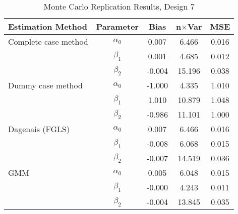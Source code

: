 \begin{table}
\centering
\caption{Monte Carlo Replication Results, Design 7}
\label{table:MCReplicationResultsDesign7}
\begin{tabular}{lcccc}
\toprule
Estimation Method & Parameter & Bias & n$\times$Var & MSE \\
\midrule
Complete case method & $\alpha_0$ & 0.007 & 6.466 & 0.016 \\
 & $\beta_1$ & 0.001 & 4.685 & 0.012 \\
 & $\beta_2$ & -0.004 & 15.196 & 0.038 \\
Dummy case method & $\alpha_0$ & -1.000 & 4.335 & 1.010 \\
 & $\beta_1$ & 1.010 & 10.879 & 1.048 \\
 & $\beta_2$ & -0.986 & 11.101 & 1.000 \\
Dagenais (FGLS) & $\alpha_0$ & 0.007 & 6.466 & 0.016 \\
 & $\beta_1$ & -0.008 & 6.068 & 0.015 \\
 & $\beta_2$ & -0.007 & 14.519 & 0.036 \\
GMM & $\alpha_0$ & 0.005 & 6.048 & 0.015 \\
 & $\beta_1$ & -0.000 & 4.243 & 0.011 \\
 & $\beta_2$ & -0.004 & 13.845 & 0.035 \\
\bottomrule
\end{tabular}
\end{table}
